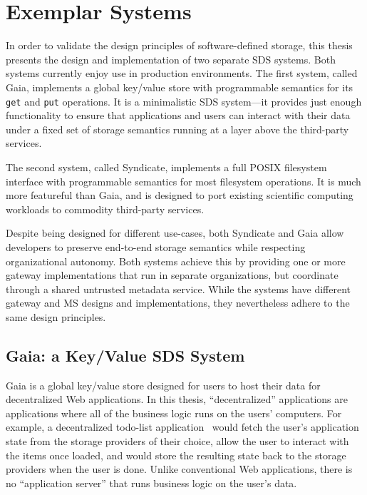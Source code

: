 \chapter{Exemplar Systems}
\label{chap:syndicate_sds}

In order to validate the design principles of software-defined storage, this 
thesis presents the design and implementation of two separate SDS systems.
Both systems currently enjoy use in production environments.
The first system, called Gaia, implements a global key/value store with programmable semantics for its
\texttt{get} and \texttt{put} operations.  It is a minimalistic SDS system---it
provides just enough functionality to ensure that applications and
users can interact with their data under a fixed set of storage
semantics running at a layer above the third-party services.

The second system, called Syndicate, implements
a full POSIX filesystem interface with programmable semantics for most
filesystem operations.  It is much more featureful than Gaia, and is designed
to port existing scientific computing workloads to commodity third-party
services.

Despite being designed for different use-cases, both Syndicate and Gaia allow
developers to preserve end-to-end storage semantics while respecting
organizational autonomy.  Both systems achieve this by providing one or more
gateway implementations that run in separate organizations, but
coordinate through a shared untrusted metadata service.  While the systems have
different gateway and MS designs and implementations, they nevertheless adhere to
the same design principles.

\section{Gaia: a Key/Value SDS System}

Gaia is a global key/value store designed for users to host their data
for decentralized Web applications.  In this thesis, ``decentralized''
applications are applications where all of the business logic runs on the
users' computers.  For example, a decentralized todo-list
application~\cite{blockstack-todo} would fetch the user's application state from
the storage providers of their choice, allow the user to interact with the items
once loaded, and would store the resulting state back to the storage providers
when the user is done.  Unlike conventional Web applications,
there is no ``application server'' that runs business logic on the user's data.

